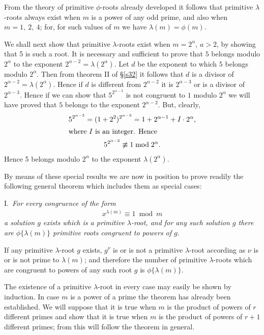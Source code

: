 \documentclass[oneside]{book}
\begin{document}
From the theory of primitive $\phi$-roots already developed it
follows that primitive $\lambda$-roots always exist when $m$ is a
power of any odd prime, and also when $m = 1,\ 2,\ 4$; for, for such
values of $m$ we have $\lambda(m) = \phi(m)$.

We shall next show that primitive $\lambda$-roots exist when $m =
2^{\alpha}$, $a > 2$, by showing that 5 is such a root. It is
necessary and sufficient to prove that $5$ belongs modulo
$2^{\alpha}$ to the exponent $2^{\alpha-2} = \lambda(2^{\alpha})$.
Let $d$ be the exponent to which $5$ belongs modulo $2^{\alpha}$.
Then from theorem II of \S \ref{s32} it follows that $d$ is a
divisor of $2^{\alpha-2} = \lambda(2^{\alpha})$. Hence if $d$ is
different from $2^{\alpha-2}$ it is $2^{\alpha-3}$ or is a divisor
of $2^{\alpha-3}$. Hence if we can show that $5^{2^{\alpha-3}}$ is
not congruent to $1$ modulo $2^{\alpha}$ we will have proved that
$5$ belongs to the exponent $2^{\alpha-2}$. But, clearly,
\begin{gather*}
5^{2^{\alpha-3}} = (1+2^2)^{2^{\alpha-3}}
 = 1+2^{\alpha-1}+ I\cdot 2^{\alpha}, \\
\intertext{where $I$ is an integer. Hence}
5^{2^{\alpha-3}} \not\equiv 1 \bmod 2^{\alpha}.
\end{gather*}
Hence 5 belongs modulo $2^{\alpha}$ to the exponent
$\lambda(2^{\alpha})$.

By means of these special results we are now in position to prove
readily the following general theorem which includes them as special
cases:

\smallskip I.~\emph{For every congruence of the form}
\begin{gather*}
x^{\lambda(m)} \equiv 1 \bmod m
\end{gather*}
\emph{a solution $g$ exists which is a primitive $\lambda$-root, and
for any such solution $g$ there are $\phi\{\lambda(m)\}$ primitive
roots congruent to powers of $g$.}

If any primitive $\lambda$-root $g$ exists, $g^\nu$ is or is not a
primitive $\lambda$-root according as $\nu$ is or is not prime to
$\lambda(m)$; and therefore the number of primitive $\lambda$-roots
which are congruent to powers of any such root $g$ is
$\phi\{\lambda(m)\}$.

The existence of a primitive $\lambda$-root in every case may easily
be shown by induction. In case $m$ is a power of a prime the theorem
has already been established. We will suppose that it is true when
$m$ is the product of powers of $r$ different primes and show that
it is true when $m$ is the product of powers of $r+1$ different
primes; from this will follow the theorem in general.
\end{document}
